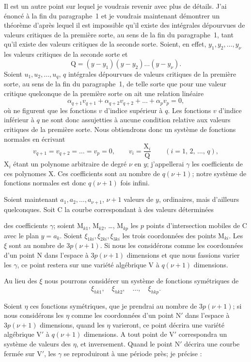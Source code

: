 \documentclass{article}
\begin{document}
Il est un autre point sur lequel je voudrais revenir avec plus de détails. J'ai énoncé à la fin du paragraphe~1 et je voudrais maintenant démontrer un théorème d'après lequel il est impossible qu'il existe des intégrales dépourvues de valeurs critiques de la première sorte, au sens de la fin du paragraphe~1, tant qu'il existe des valeurs critiques de la seconde sorte. Soient, en effet, $y_{1}, y_{2}, \ldots, y_{\nu}$ les valeurs critiques de la seconde sorte et
\[
\mathrm{Q} = (y - y_{1})(y - y_{2})\ldots(y - y_{\nu}).
\]
Soient $u_{1}, u_{2}, \ldots, u_{q}$, $q$ intégrales dépourvues de valeurs critiques de la première sorte, au sens de la fin du paragraphe~1, de telle sorte que pour une valeur critique quelconque de la première sorte on ait une relation linéaire
\[
\alpha_{q+1} v_{q+1} + \alpha_{q+2} v_{q+2} + \ldots + \alpha_{p} v_{p} = 0,
\]
où ne figurent que les fonctions $v$ d'indice supérieur à $q$. Les fonctions $v$ d'indice inférieur à $q$ ne sont donc assujetties à aucune condition relative aux valeurs critiques de la première sorte. Nous obtiendrons donc un système de fonctions normales en écrivant
\[
v_{q+1} = v_{q+2} = \ldots = v_{p} = 0, \qquad v_{i} = \frac{\mathrm{X}_{i}}{\mathrm{Q}} \qquad (i = 1,\, 2,\, \ldots,\, q),
\]
$\mathrm{X}_{i}$ étant un polynome arbitraire de degré $\nu$ en $y$; j'appellerai $\gamma$ les coefficients de ces polynomes $\mathrm{X}$. Ces coefficients sont au nombre de $q(\nu + 1)$; notre système de fonctions normales est donc $q(\nu + 1)$ fois infini.

Soient maintenant $a_{1}, a_{2}, \ldots, a_{\nu+1}$, $\nu + 1$ valeurs de $y$, ordinaires, mais d'ailleurs quelconques. Soit $\mathrm{C}$ la courbe correspondant à des valeurs déterminées

des coefficients $\gamma$; soient $\mathrm{M}_{k1}$, $\mathrm{M}_{k2}$, \dots, $\mathrm{M}_{kp}$ les $p$ points d'intersection mobiles de $\mathrm{C}$ avec le plan $y = a_{k}$. Soient $\xi_{1ki}, \xi_{2ki}, \xi_{3ki}$ les trois coordonnées des points $\mathrm{M}_{ki}$. Les $\xi$ sont au nombre de $3p(\nu+1)$. Si nous les considérons comme les coordonnées d'un point $\mathrm{N}$ dans l'espace à $3p(\nu+1)$ dimensions et que nous fassions varier les $\gamma$, ce point restera sur une variété algébrique $\mathrm{V}$ à $q(\nu+1)$ dimensions.

Au lieu des $\xi$ nous pourrons considérer un système de fonctions symétriques de
\[
\xi_{hk1}, \quad \xi_{hk2}, \quad \dots, \quad \xi_{hkp}.
\]

Soient $\eta$ ces fonctions symétriques, que je prendrai au nombre de $3p(\nu+1)$; si nous considérons les $\eta$ comme les coordonnées d'un point $\mathrm{N}'$ dans l'espace à $3p(\nu+1)$ dimensions, quand les $\eta$ varieront, ce point décrira une variété algébrique $\mathrm{V}'$ à $q(\nu+1)$ dimensions. A tout point de $\mathrm{V}'$ correspondra un système de valeurs des $\eta$, et inversement. Quand le point $\mathrm{N}'$ décrira une courbe fermée sur $\mathrm{V}'$, les $\gamma$ se reproduiront à une période près; je précise :
\end{document}
